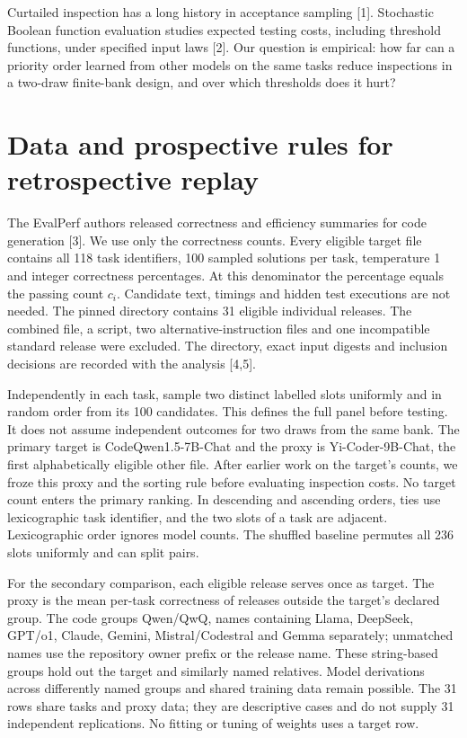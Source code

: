\documentclass[10pt,a4paper]{article}
\begin{document}
Curtailed inspection has a long history in acceptance sampling [1]. Stochastic Boolean function evaluation studies expected testing costs, including threshold functions, under specified input laws [2]. Our question is empirical: how far can a priority order learned from other models on the same tasks reduce inspections in a two-draw finite-bank design, and over which thresholds does it hurt?

\newpage
\section{Data and prospective rules for retrospective replay}
The EvalPerf authors released correctness and efficiency summaries for code generation [3]. We use only the correctness counts. Every eligible target file contains all 118 task identifiers, 100 sampled solutions per task, temperature 1 and integer correctness percentages. At this denominator the percentage equals the passing count $c_i$. Candidate text, timings and hidden test executions are not needed. The pinned directory contains 31 eligible individual releases. The combined file, a script, two alternative-instruction files and one incompatible standard release were excluded. The directory, exact input digests and inclusion decisions are recorded with the analysis [4,5].

Independently in each task, sample two distinct labelled slots uniformly and in random order from its 100 candidates. This defines the full panel before testing. It does not assume independent outcomes for two draws from the same bank. The primary target is CodeQwen1.5-7B-Chat and the proxy is Yi-Coder-9B-Chat, the first alphabetically eligible other file. After earlier work on the target's counts, we froze this proxy and the sorting rule before evaluating inspection costs. No target count enters the primary ranking. In descending and ascending orders, ties use lexicographic task identifier, and the two slots of a task are adjacent. Lexicographic order ignores model counts. The shuffled baseline permutes all 236 slots uniformly and can split pairs.

For the secondary comparison, each eligible release serves once as target. The proxy is the mean per-task correctness of releases outside the target's declared group. The code groups Qwen/QwQ, names containing Llama, DeepSeek, GPT/o1, Claude, Gemini, Mistral/Codestral and Gemma separately; unmatched names use the repository owner prefix or the release name. These string-based groups hold out the target and similarly named relatives. Model derivations across differently named groups and shared training data remain possible. The 31 rows share tasks and proxy data; they are descriptive cases and do not supply 31 independent replications. No fitting or tuning of weights uses a target row.
\end{document}
